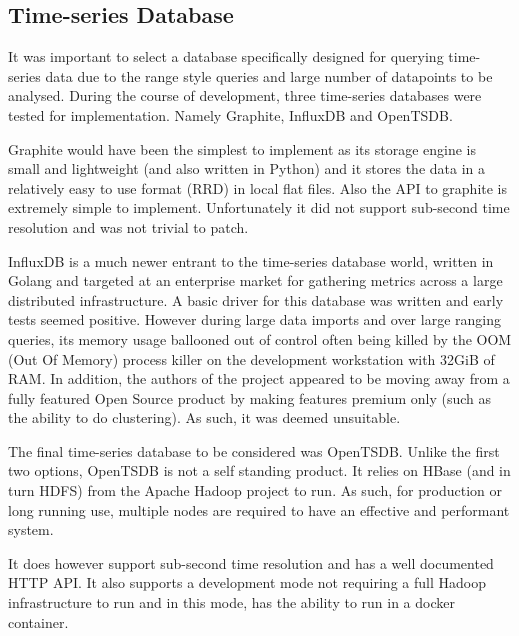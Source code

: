 \documentclass[11pt, a4paper]{scrartcl}
\begin{document}
	\subsection{Time-series Database}
	It was important to select a database specifically designed for querying time-series data due to the range style queries and large number of datapoints to be analysed.  During the course of development, three time-series databases were tested for implementation.  Namely Graphite, InfluxDB and OpenTSDB.
	
	Graphite would have been the simplest to implement as its storage engine is small and lightweight (and also written in Python) and it stores the data in a relatively easy to use format (RRD) in local flat files.  Also the API to graphite is extremely simple to implement. Unfortunately it did not support sub-second time resolution and was not trivial to patch.
	
	InfluxDB is a much newer entrant to the time-series database world, written in Golang and targeted at an enterprise market for gathering metrics across a large distributed infrastructure.  A basic driver for this database was written and early tests seemed positive.  However during large data imports and over large ranging queries, its memory usage ballooned out of control often being killed by the OOM (Out Of Memory) process killer on the development workstation with 32GiB of RAM.  In addition, the authors of the project appeared to be moving away from a fully featured Open Source product by making features premium only (such as the ability to do clustering).  As such, it was deemed unsuitable.
	
	The final time-series database to be considered was OpenTSDB.  Unlike the first two options, OpenTSDB is not a self standing product.  It relies on HBase (and in turn HDFS) from the Apache Hadoop project to run.  As such, for production or long running use, multiple nodes are required to have an effective and performant system.
	
	It does however support sub-second time resolution and has a well documented HTTP API.  It also supports a development mode not requiring a full Hadoop infrastructure to run and in this mode, has the ability to run in a docker container.
	
	
\end{document}
